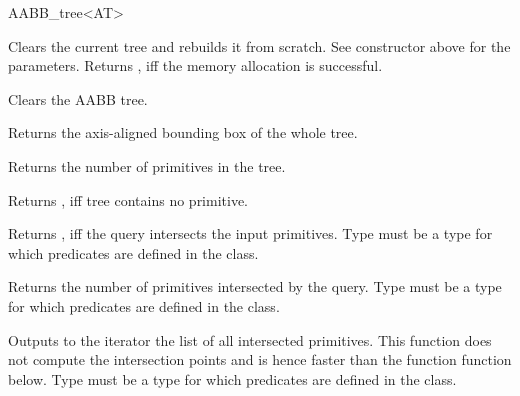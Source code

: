 \begin{ccRefClass}{AABB_tree<AT>}
\ccOperations

{Clears the current tree and rebuilds it from scratch. See constructor above for the parameters. Returns , iff the memory allocation is successful. }

{Clears the AABB tree. }

{Returns the axis-aligned bounding box of the whole tree. }

{Returns the number of primitives in the tree. }

{Returns , iff tree contains no primitive. }


{ Returns , iff the query intersects the input primitives. Type  must be a type for which  predicates are defined in the  class.}
	
{Returns the number of primitives intersected by the query. Type  must be a type for which  predicates are defined in the  class.}


{Outputs to the iterator the list of all intersected primitives. This function does not compute the intersection points and is hence faster than the function  function below. Type  must be a type for which  predicates are defined in the  class.}


\end{ccRefClass}
